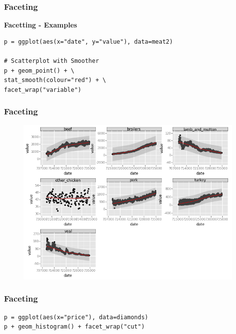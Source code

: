 \documentclass{beamer}
\begin{document}
\begin{frame}[fragile]
	\frametitle{Faceting}
	\Large 
	\noindent \textbf{Facetting - Examples}
{
	\large
	\begin{framed}
		\begin{verbatim}
p = ggplot(aes(x="date", y="value"), data=meat2)

# Scatterplot with Smoother
p + geom_point() + \
stat_smooth(colour="red") + \
facet_wrap("variable")
		\end{verbatim}
		
	\end{framed}
}
\end{frame}
\begin{frame}
\frametitle{Faceting}
	
	\begin{figure}
		\centering
		\includegraphics[width=1.0\linewidth]{Facet1}
		\caption{}
		\label{fig:Facet1}
	\end{figure}
	
\end{frame}
\begin{frame}[fragile]
	\frametitle{Faceting}
\Large
	\begin{framed}
		\begin{verbatim}
p = ggplot(aes(x="price"), data=diamonds)
p + geom_histogram() + facet_wrap("cut")
		\end{verbatim}
		
	\end{framed}
\end{frame}
\end{document}
